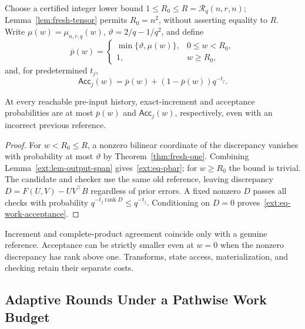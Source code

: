 

Choose a certified integer lower bound $1\le R_0\le R=\mathcal R_q(n,r,n)$;
Lemma~\ref{lem:fresh-tensor} permits $R_0=n^2$, without asserting equality
to $R$. Write $\mu(w)=\mu_{n,r,q}(w)$, $\vartheta=2/q-1/q^2$, and define
\begin{equation}
\overline p(w)=
\begin{cases}
\min\{\vartheta,\mu(w)\},&0\le w<R_0,\\
1,&w\ge R_0,
\end{cases}
\label{ext:eq-pbar}
\end{equation}
and, for predetermined $t_j$,
\begin{equation}
\mathsf{Acc}_j(w)=\overline p(w)+(1-\overline p(w))q^{-t_j}.
\label{ext:eq-work-acceptance}
\end{equation}

\begin{corollary}
\label{ext:cor-work-acceptance}
At every reachable pre-input history, exact-increment and acceptance
probabilities are at most $\overline p(w)$ and $\mathsf{Acc}_j(w)$,
respectively, even with an incorrect previous reference.
\end{corollary}

\begin{proof}
For $w<R_0\le R$, a nonzero bilinear coordinate of the discrepancy
vanishes with probability at most $\vartheta$ by
Theorem~\ref{thm:fresh-one}. Combining Lemma~\ref{ext:lem-output-span}
gives~\eqref{ext:eq-pbar}; for $w\ge R_0$ the bound is trivial.
The candidate and checker use the same old reference, leaving discrepancy
$D=F(U,V)-UV^\top B$ regardless of prior errors. A fixed nonzero $D$
passes all checks with probability $q^{-t_j\operatorname{rank}D}\le q^{-t_j}$.
Conditioning on $D=0$ proves~\eqref{ext:eq-work-acceptance}.
\end{proof}

Increment and complete-product agreement coincide only with a genuine
reference. Acceptance can be strictly smaller even at $w=0$ when the
nonzero discrepancy has rank above one. Transforms, state access,
materialization, and checking retain their separate costs.

\subsection{Adaptive Rounds Under a Pathwise Work Budget}
\label{ext:sec-profile-dp}

